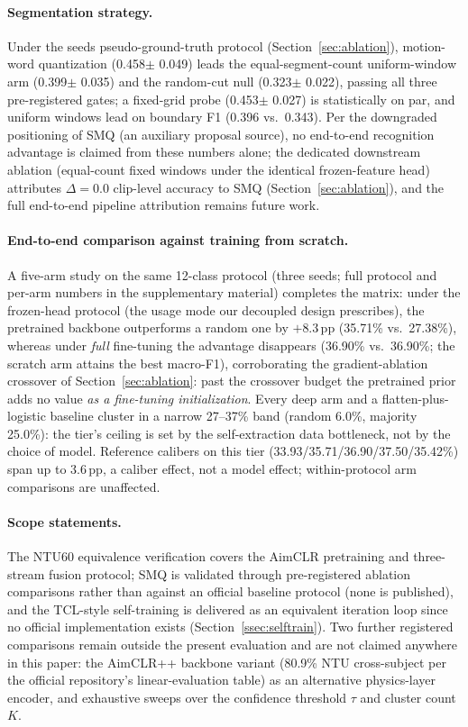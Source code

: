 \paragraph{Segmentation strategy.}
Under the seeds pseudo-ground-truth protocol (Section~\ref{sec:ablation}), motion-word quantization (0.458$\pm$ 0.049) leads the equal-segment-count uniform-window arm (0.399$\pm$ 0.035) and the random-cut null (0.323$\pm$ 0.022), passing all three pre-registered gates; a fixed-grid probe (0.453$\pm$ 0.027) is statistically on par, and uniform windows lead on boundary F1 (0.396 vs.\ 0.343). Per the downgraded positioning of SMQ (an auxiliary proposal source), no end-to-end recognition advantage is claimed from these numbers alone; the dedicated downstream ablation (equal-count fixed windows under the identical frozen-feature head) attributes $\Delta = 0.0$ clip-level accuracy to SMQ (Section~\ref{sec:ablation}), and the full end-to-end pipeline attribution remains future work.

\paragraph{End-to-end comparison against training from scratch.}
A five-arm study on the same 12-class protocol (three seeds; full protocol and per-arm numbers in the supplementary material) completes the matrix: under the frozen-head protocol (the usage mode our decoupled design prescribes), the pretrained backbone outperforms a random one by $+8.3$\,pp (35.71\% vs.\ 27.38\%), whereas under \emph{full} fine-tuning the advantage disappears (36.90\% vs.\ 36.90\%; the scratch arm attains the best macro-F1), corroborating the gradient-ablation crossover of Section~\ref{sec:ablation}: past the crossover budget the pretrained prior adds no value \emph{as a fine-tuning initialization}. Every deep arm and a flatten-plus-logistic baseline cluster in a narrow 27--37\% band (random 6.0\%, majority 25.0\%): the tier's ceiling is set by the self-extraction data bottleneck, not by the choice of model. Reference calibers on this tier (33.93/35.71/36.90/37.50/35.42\%) span up to 3.6\,pp, a caliber effect, not a model effect; within-protocol arm comparisons are unaffected.

\paragraph{Scope statements.}
The NTU60 equivalence verification covers the AimCLR pretraining and three-stream fusion protocol; SMQ is validated through pre-registered ablation comparisons rather than against an official baseline protocol (none is published), and the TCL-style self-training is delivered as an equivalent iteration loop since no official implementation exists (Section~\ref{ssec:selftrain}). Two further registered comparisons remain outside the present evaluation and are not claimed anywhere in this paper: the AimCLR++ backbone variant (80.9\% NTU cross-subject per the official repository's linear-evaluation table) as an alternative physics-layer encoder, and exhaustive sweeps over the confidence threshold $\tau$ and cluster count $K$.


